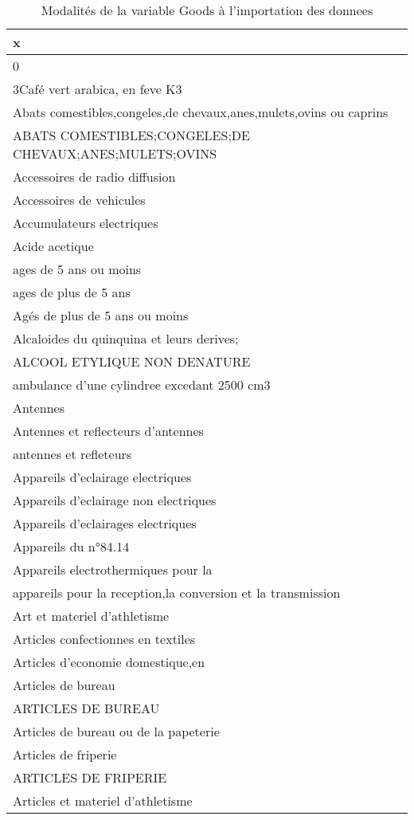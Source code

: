 \documentclass[
]{book}
\begin{document}
\begin{longtable}[t]{l}
\caption{\label{tab:g}Modalités de la variable Goods à l'importation des donnees}\\
\toprule
x\\
\midrule
0\\
3Café vert arabica, en feve K3\\
Abats comestibles,congeles,de chevaux,anes,mulets,ovins ou caprins\\
ABATS COMESTIBLES;CONGELES;DE CHEVAUX;ANES;MULETS;OVINS\\
Accessoires de radio diffusion\\
\addlinespace
Accessoires de vehicules\\
Accumulateurs electriques\\
Acide acetique\\
ages de 5 ans ou moins\\
ages de plus de 5 ans\\
\addlinespace
Agés de plus de 5 ans ou moins\\
Alcaloides du quinquina et leurs derives;\\
ALCOOL ETYLIQUE NON DENATURE\\
ambulance d'une cylindree excedant 2500 cm3\\
Antennes\\
\addlinespace
Antennes et reflecteurs d'antennes\\
antennes et refleteurs\\
Appareils d'eclairage electriques\\
Appareils d'eclairage non electriques\\
Appareils d'eclairages electriques\\
\addlinespace
Appareils du n°84.14\\
Appareils electrothermiques pour la\\
appareils pour la reception,la conversion et la transmission\\
Art et materiel d'athletisme\\
Articles confectionnes en textiles\\
\addlinespace
Articles d'economie domestique,en\\
Articles de bureau\\
ARTICLES DE BUREAU\\
Articles de bureau ou de la papeterie\\
Articles de friperie\\
\addlinespace
ARTICLES DE FRIPERIE\\
Articles et materiel d'athletisme\\

\end{longtable}
\end{document}
